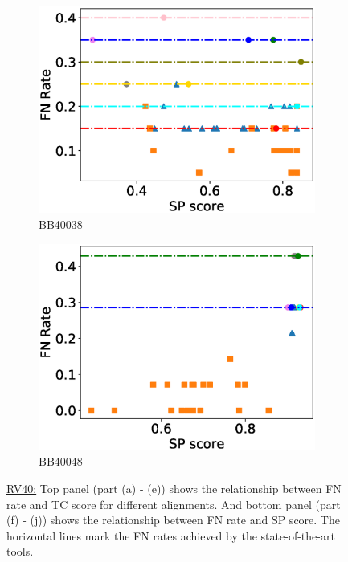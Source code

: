 \begin{figure}[!htbp]
\begin{adjustwidth}{-1cm}{-1cm}
\begin{subfigure}{0.22\textwidth}
			\includegraphics[width=\columnwidth]{Figure/summary/precomputedInit/Balibase/BB40038_fnrate_vs_sp_2}
			\caption{BB40038}
		\end{subfigure}	
		\begin{subfigure}{0.22\textwidth}
			\includegraphics[width=\columnwidth]{Figure/summary/precomputedInit/Balibase/BB40048_fnrate_vs_sp_2}
			\caption{BB40048}
		\end{subfigure}
		\caption{\underline{RV40:} Top panel (part (a) - (e)) shows the relationship between FN rate and TC score for different alignments. And bottom panel (part (f) - (j)) shows the relationship between FN rate and SP score. The horizontal lines mark the FN rates achieved by the state-of-the-art tools.}
		\label{fig:rv40_fnrate_vs_tc}
	\end{adjustwidth}
\end{figure}
